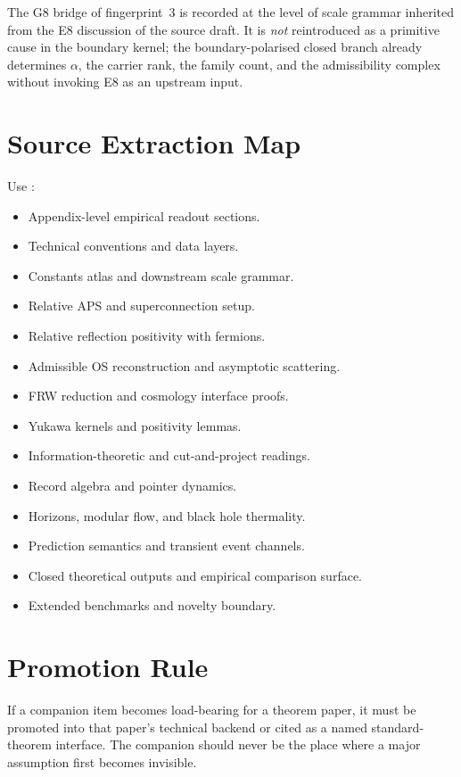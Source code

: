 \documentclass[11pt,a4paper]{article}
\begin{document}
\begin{remark}
The G8 bridge of fingerprint~3 is recorded at the level of scale grammar inherited from the E8
discussion of the source draft. It is \emph{not} reintroduced as a primitive cause in the
boundary kernel; the boundary-polarised closed branch already determines $\alpha$, the carrier
rank, the family count, and the admissibility complex without invoking E8 as an upstream input.
\end{remark}

\section{Source Extraction Map}

\begin{tfptsourcebox}
Use \sourceDraft:
\begin{itemize}[leftmargin=1.5em]
    \item Appendix-level empirical readout sections.
    \item Technical conventions and data layers.
    \item Constants atlas and downstream scale grammar.
    \item Relative APS and superconnection setup.
    \item Relative reflection positivity with fermions.
    \item Admissible OS reconstruction and asymptotic scattering.
    \item FRW reduction and cosmology interface proofs.
    \item Yukawa kernels and positivity lemmas.
    \item Information-theoretic and cut-and-project readings.
    \item Record algebra and pointer dynamics.
    \item Horizons, modular flow, and black hole thermality.
    \item Prediction semantics and transient event channels.
    \item Closed theoretical outputs and empirical comparison surface.
    \item Extended benchmarks and novelty boundary.
\end{itemize}
\end{tfptsourcebox}

\section{Promotion Rule}

If a companion item becomes load-bearing for a theorem paper, it must be promoted into that paper's
technical backend or cited as a named standard-theorem interface. The companion should never be the
place where a major assumption first becomes invisible.
\end{document}
